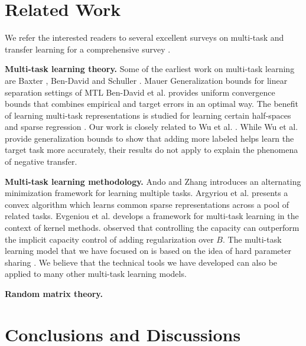 \section{Related Work}


We refer the interested readers to several excellent surveys on multi-task and transfer learning for a comprehensive survey \cite{PY09,R17,ZY17,V20}.

\textbf{Multi-task learning theory.}
Some of the earliest work on multi-task learning are Baxter \cite{B00}, Ben-David and Schuller \cite{BS03}.
Mauer \cite{M06} Generalization bounds for linear separation settings of MTL
Ben-David et al. \cite{BBCK10} provides uniform convergence bounds that combines empirical and target errors in an optimal way.
The benefit of learning multi-task representations is studied for learning certain half-spaces \cite{MPR16} and sparse regression \cite{LPTV09,LPVT11}.
Our work is closely related to Wu et al. \cite{WZR20}.
While Wu et al. provide generalization bounds to show that adding more labeled helps learn the target task more accurately, their results do not apply to explain the phenomena of negative transfer.

\textbf{Multi-task learning methodology.}
Ando and Zhang \cite{AZ05} introduces an alternating minimization framework for learning multiple tasks.
Argyriou et al. \cite{AEP08} presents a convex algorithm which learns common sparse representations across a pool of related tasks.
Evgeniou et al. \cite{EMP05} develops a framework for multi-task learning in the context of kernel methods.
\cite{KD12} observed that controlling the capacity can outperform the implicit capacity control of adding regularization over $B$.
The multi-task learning model that we have focused on is based on the idea of hard parameter sharing \cite{C93,R17}.
We believe that the technical tools we have developed can also be applied to many other multi-task learning models.

\textbf{Random matrix theory.}


\section{Conclusions and Discussions}
